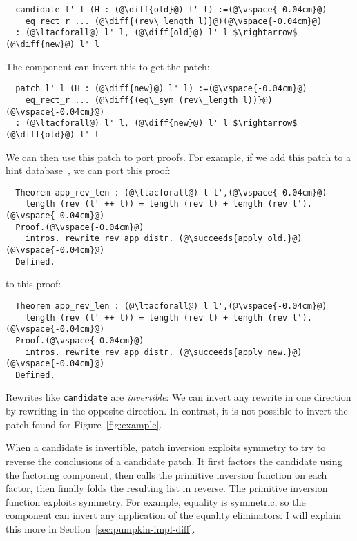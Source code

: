 \begin{lstlisting}
  candidate l' l (H : (@\diff{old}@) l' l) :=(@\vspace{-0.04cm}@)
    eq_rect_r ... (@\diff{(rev\_length l)}@)(@\vspace{-0.04cm}@)
  : (@\ltacforall@) l' l, (@\diff{old}@) l' l $\rightarrow$ (@\diff{new}@) l' l
\end{lstlisting}
The component can invert this to get the patch: %

\begin{lstlisting}
  patch l' l (H : (@\diff{new}@) l' l) :=(@\vspace{-0.04cm}@)
    eq_rect_r ... (@\diff{(eq\_sym (rev\_length l))}@)(@\vspace{-0.04cm}@)
  : (@\ltacforall@) l' l, (@\diff{new}@) l' l $\rightarrow$ (@\diff{old}@) l' l
\end{lstlisting}
We can then use this patch to port proofs.
For example, if we add this patch to a hint database~\cite{hints},
we can port this proof:

\begin{lstlisting}
  Theorem app_rev_len : (@\ltacforall@) l l',(@\vspace{-0.04cm}@)
    length (rev (l' ++ l)) = length (rev l) + length (rev l').(@\vspace{-0.04cm}@)
  Proof.(@\vspace{-0.04cm}@)
    intros. rewrite rev_app_distr. (@\succeeds{apply old.}@)(@\vspace{-0.04cm}@)
  Defined.
\end{lstlisting}
to this proof:

\begin{lstlisting}
  Theorem app_rev_len : (@\ltacforall@) l l',(@\vspace{-0.04cm}@)
    length (rev (l' ++ l)) = length (rev l) + length (rev l').(@\vspace{-0.04cm}@)
  Proof.(@\vspace{-0.04cm}@)
    intros. rewrite rev_app_distr. (@\succeeds{apply new.}@)(@\vspace{-0.04cm}@)
  Defined.
\end{lstlisting}

Rewrites like \lstinline{candidate} are \textit{invertible}:
We can invert any rewrite in one direction by rewriting in the opposite direction.
In contrast, it is not possible to invert the patch \sysname
found for Figure~\ref{fig:example}.

When a candidate is invertible, patch inversion exploits symmetry to try to reverse the conclusions of a candidate patch.
It first factors the candidate using the factoring component, then calls the primitive inversion
function on each factor, then finally folds the resulting list in reverse.
The primitive inversion function exploits symmetry. 
For example, equality is symmetric, so the component can invert any application of the equality eliminators.
I will explain this more in Section~\ref{sec:pumpkin-impl-diff}.

